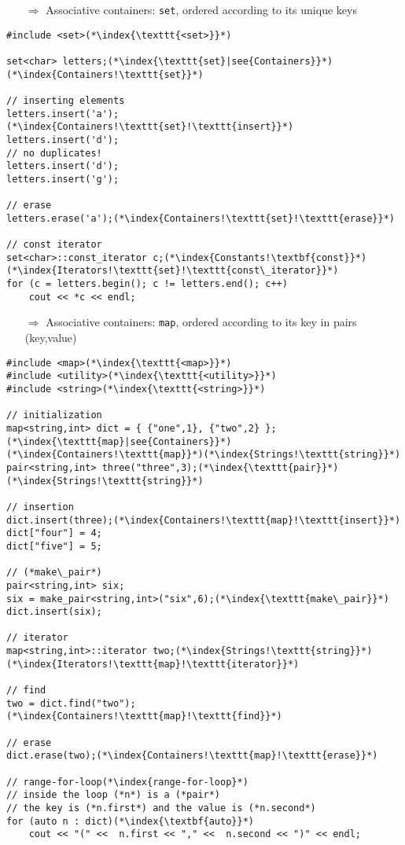 \documentclass[10pt]{article}
\begin{document}
\begin{enumerate}
\item[$\Rightarrow$] Associative containers: \texttt{set}, ordered according to its unique keys
\end{enumerate}
\begin{lstlisting}
#include <set>(*\index{\texttt{<set>}}*)

set<char> letters;(*\index{\texttt{set}|see{Containers}}*)(*\index{Containers!\texttt{set}}*)

// inserting elements    
letters.insert('a');(*\index{Containers!\texttt{set}!\texttt{insert}}*)
letters.insert('d');
// no duplicates!
letters.insert('d');
letters.insert('g');

// erase    
letters.erase('a');(*\index{Containers!\texttt{set}!\texttt{erase}}*)

// const iterator 
set<char>::const_iterator c;(*\index{Constants!\textbf{const}}*)(*\index{Iterators!\texttt{set}!\texttt{const\_iterator}}*)
for (c = letters.begin(); c != letters.end(); c++)
    cout << *c << endl;
\end{lstlisting}
\begin{enumerate}
\item[$\Rightarrow$] Associative containers: \texttt{map}, ordered according to its key in pairs (key,value)
\end{enumerate}
\begin{lstlisting}
#include <map>(*\index{\texttt{<map>}}*)
#include <utility>(*\index{\texttt{<utility>}}*)
#include <string>(*\index{\texttt{<string>}}*)

// initialization
map<string,int> dict = { {"one",1}, {"two",2} };(*\index{\texttt{map}|see{Containers}}*)(*\index{Containers!\texttt{map}}*)(*\index{Strings!\texttt{string}}*)
pair<string,int> three("three",3);(*\index{\texttt{pair}}*)(*\index{Strings!\texttt{string}}*)

// insertion    
dict.insert(three);(*\index{Containers!\texttt{map}!\texttt{insert}}*)
dict["four"] = 4;
dict["five"] = 5;

// (*make\_pair*)
pair<string,int> six;
six = make_pair<string,int>("six",6);(*\index{\texttt{make\_pair}}*)
dict.insert(six);

// iterator    
map<string,int>::iterator two;(*\index{Strings!\texttt{string}}*)(*\index{Iterators!\texttt{map}!\texttt{iterator}}*)

// find    
two = dict.find("two");(*\index{Containers!\texttt{map}!\texttt{find}}*)

// erase    
dict.erase(two);(*\index{Containers!\texttt{map}!\texttt{erase}}*)

// range-for-loop(*\index{range-for-loop}*)
// inside the loop (*n*) is a (*pair*)
// the key is (*n.first*) and the value is (*n.second*)
for (auto n : dict)(*\index{\textbf{auto}}*)
    cout << "(" <<  n.first << "," <<  n.second << ")" << endl;
\end{lstlisting}
\end{document}
